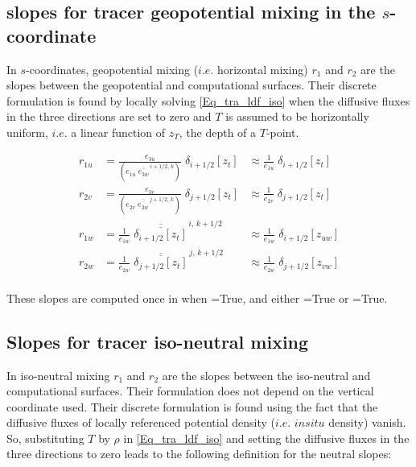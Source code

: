 {%

\subsection{slopes for tracer geopotential mixing in the $s$-coordinate}

In $s$-coordinates, geopotential mixing ($i.e.$ horizontal mixing) $r_1$ and 
$r_2$ are the slopes between the geopotential and computational surfaces. 
Their discrete formulation is found by locally solving \eqref{Eq_tra_ldf_iso} 
when the diffusive fluxes in the three directions are set to zero and $T$ is 
assumed to be horizontally uniform, $i.e.$ a linear function of $z_T$, the 
depth of a $T$-point. 

\begin{equation} \label{Eq_ldfslp_geo}
\begin{aligned}
 r_{1u} &= \frac{e_{3u}}{ \left( e_{1u}\;\overline{\overline{e_{3w}}}^{\,i+1/2,\,k} \right)}
 			  \;\delta_{i+1/2}[z_t] 
 		&\approx \frac{1}{e_{1u}}\; \delta_{i+1/2}[z_t] 
\\
 r_{2v} &= \frac{e_{3v}}{\left( e_{2v}\;\overline{\overline{e_{3w}}}^{\,j+1/2,\,k} \right)} 
 			  \;\delta_{j+1/2} [z_t] 
		&\approx \frac{1}{e_{2v}}\; \delta_{j+1/2}[z_t] 
\\
 r_{1w} &= \frac{1}{e_{1w}}\;\overline{\overline{\delta_{i+1/2}[z_t]}}^{\,i,\,k+1/2}
 		&\approx \frac{1}{e_{1w}}\; \delta_{i+1/2}[z_{uw}] 
 \\
 r_{2w} &= \frac{1}{e_{2w}}\;\overline{\overline{\delta_{j+1/2}[z_t]}}^{\,j,\,k+1/2}
		&\approx \frac{1}{e_{2w}}\; \delta_{j+1/2}[z_{vw}] 
 \\
\end{aligned}
\end{equation}


These slopes are computed once in  when =True, 
and either =True or =True. 

\subsection{Slopes for tracer iso-neutral mixing}\label{LDF_slp_iso}
In iso-neutral mixing  $r_1$ and $r_2$ are the slopes between the iso-neutral 
and computational surfaces. Their formulation does not depend on the vertical 
coordinate used. Their discrete formulation is found using the fact that the 
diffusive fluxes of locally referenced potential density ($i.e.$ $in situ$ density) 
vanish. So, substituting $T$ by $\rho$ in \eqref{Eq_tra_ldf_iso} and setting the 
diffusive fluxes in the three directions to zero leads to the following definition for 
the neutral slopes:

}
